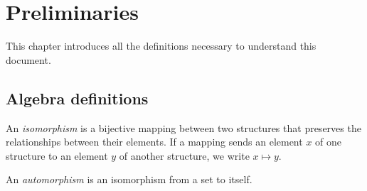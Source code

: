 \chapter{Preliminaries}

This chapter introduces all the definitions necessary to understand this document.
\section{Algebra definitions}

\begin{definition}[informal]
An \emph{isomorphism} is a bijective mapping between two structures that preserves the relationships between their elements. If a mapping sends an element $x$ of one structure to an element $y$ of another structure, we write $x \mapsto y$.



An \emph{automorphism} is an isomorphism from a set to itself.
\end{definition}
\vspace{1em}
